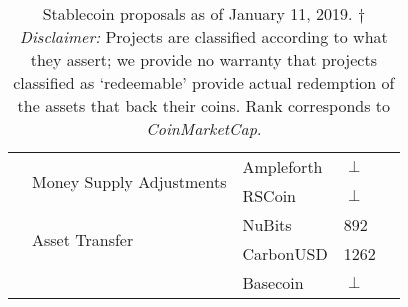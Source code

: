 \begin{table*}[t]
\begin{tabular}{|l|l|l|l|l|}
						& \multirow{2}{*}{Money Supply Adjustments}  				& Ampleforth		& $\perp$  \\ \cline{3-4}
						&   													& RSCoin 			& $\perp$  \\ \cline{2-4}
						& \multirow{2}{*}{Asset Transfer}  							& NuBits			& 892 \\ \cline{3-4}
						&													& CarbonUSD		& 1262 \\ \cline{3-4}
						&													& Basecoin 		& $\perp$ \\ \cline{1-4}
\hline
\end{tabular}
\caption{Stablecoin proposals as of January 11, 2019. $\dagger$ \textit{Disclaimer:} Projects are classified according to what they assert; \eg we provide no warranty that projects classified as `redeemable' provide actual redemption of the assets that back their coins. Rank corresponds to \textit{CoinMarketCap}.\label{tab:stablecoins}}
\end{table*}




